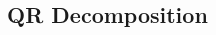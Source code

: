 \documentclass{article}
\begin{document}
\begin{multicols*}{3}
    \subsection{QR Decomposition}

\end{multicols*}
\end{document}
